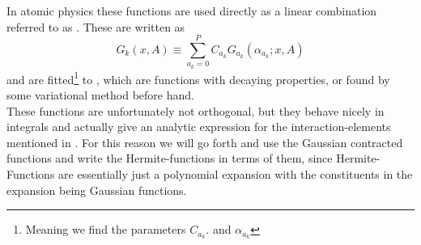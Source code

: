     In atomic physics these functions are used directly as a linear combination
    referred to as . These are written as
        \begin{equation}
            G_k(x, A) \equiv \sum\limits^P_{a_k=0} C_{a_k}
            G_{a_k}(\alpha_{a_k};x, A)
        \end{equation}
    and are fitted\footnote{Meaning we find the parameters $C_{a_k}.$ and
    $\alpha_{a_k}$} to , which are functions with
    decaying properties, or found by some variational method before hand. \\

    These functions are unfortunately not orthogonal, but they behave nicely in
    integrals and actually give an analytic expression for the
    interaction-elements mentioned in . For this reason we
    will go forth and use the Gaussian contracted functions and write the
    Hermite-functions in terms of them, since Hermite-Functions are essentially
    just a polynomial expansion with the constituents in the expansion being
    Gaussian functions.

